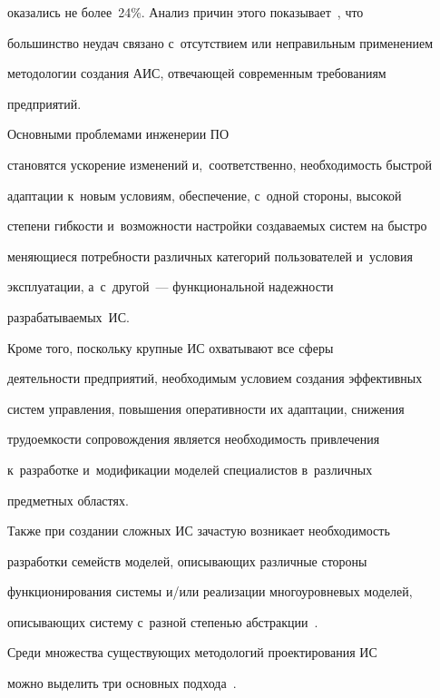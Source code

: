 оказались не более~24\%. Анализ причин этого показывает~\cite{25-luk}, что 


большинство неудач связано с~отсутствием или неправильным применением 


методологии создания АИС, отвечающей современным требованиям 


предприятий.


     


     Основными проблемами инженерии ПО


становятся ускорение изменений и,~соответственно, необходимость быстрой 


адаптации к~новым условиям, обеспечение, с~одной стороны, высокой 


степени гибкости и~возможности настройки создаваемых систем на быстро 


меняющиеся потребности различных категорий пользователей и~условия 


эксплуатации, а~с~другой~--- функциональной надежности 


разрабатываемых~ИС.


     


     Кроме того, поскольку крупные ИС охватывают все сферы 


деятельности предприятий, необходимым условием создания эффективных 


систем управления, повышения оперативности их адаптации, снижения 


трудоемкости сопровождения является необходимость привлечения 


к~разработке и~модификации моделей специалистов в~различных 


предметных областях.


     


     Также при создании сложных ИС зачастую возникает необходимость 


разработки семейств моделей, описывающих различные стороны 


функционирования сис\-те\-мы и\!/\!или реализации многоуровневых моделей, 


описывающих систему с~разной степенью абстракции~\cite{17-luk}.


     


     Среди множества существующих методологий проектирования ИС 


можно выделить три основных подхода~\cite{24-luk}.



